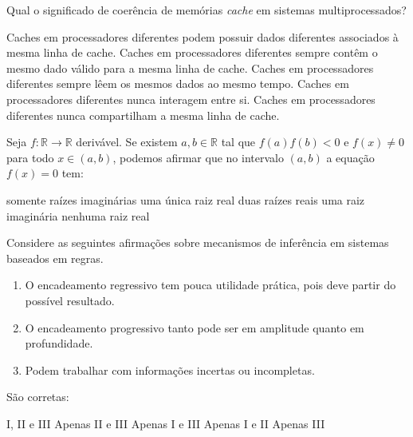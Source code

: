 \documentclass[12pt, addpoints]{exam}
\begin{document}
    \begin{questions}

    \newpage
    \question

Qual o significado de coerência de memórias \textit{cache} em sistemas multiprocessados?


\begin{choices}
\choice Caches em processadores diferentes podem possuir dados diferentes associados à mesma linha de cache.
\choice Caches em processadores diferentes sempre contêm o mesmo dado válido para a mesma linha de cache.
\choice Caches em processadores diferentes sempre lêem os mesmos dados ao mesmo tempo.
\choice Caches em processadores diferentes nunca interagem entre si.
\choice Caches em processadores diferentes nunca compartilham a mesma linha de cache.
\end{choices}

\question

Seja \( f : \mathbb{R} \to \mathbb{R} \) derivável. Se existem \( a, b \in \mathbb{R} \) tal que \( f(a)f(b) < 0 \) e \( f(x) \neq 0 \) para todo \( x \in (a, b) \), podemos afirmar que no intervalo \( (a, b) \) a equação \( f(x) = 0 \) tem:
\begin{choices}
\choice somente raízes imaginárias
\choice uma única raiz real
\choice duas raízes reais
\choice uma raiz imaginária
\choice nenhuma raiz real
\end{choices}

\question

Considere as seguintes afirmações sobre mecanismos de inferência em sistemas baseados em regras.

\begin{enumerate}[label=\Roman*.]

    \item O encadeamento regressivo tem pouca utilidade prática, pois deve partir do possível resultado.

    \item O encadeamento progressivo tanto pode ser em amplitude quanto em profundidade.

    \item Podem trabalhar com informações incertas ou incompletas. 

\end{enumerate}

São corretas:
\begin{choices}
\choice I, II e III
\choice Apenas II e III
\choice Apenas I e III
\choice Apenas I e II
\choice Apenas III
\end{choices}


\end{questions}
\end{document}
